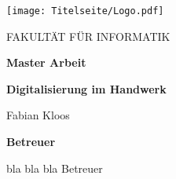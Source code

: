 \thispagestyle{empty}

\begin{titlepage}

\vspace{3cm}

\begin{center}
	\texttt{[image: Titelseite/Logo.pdf]}  
\end{center}

\vspace{2.5cm}

\begin{center}
  \Large FAKULTÄT FÜR INFORMATIK
\end{center}

\vspace{1cm}
\begin{center}
	\Huge
	\textbf{Master Arbeit}\\
\end{center}

\vspace{1cm}

\begin{center}
	\Large
	\textbf{Digitalisierung im Handwerk}
\end{center}

\vspace{1.5cm}

\begin{center}
	\Large
	Fabian Kloos
\end{center}

\vspace{3.5cm}

\begin{center}
    \large
	\textbf{Betreuer}
\end{center}

\vspace{0.3cm}

\begin{center}
    \large
    bla bla bla Betreuer
\end{center}

\newpage
\thispagestyle{empty}
\mbox{}
\end{titlepage}
